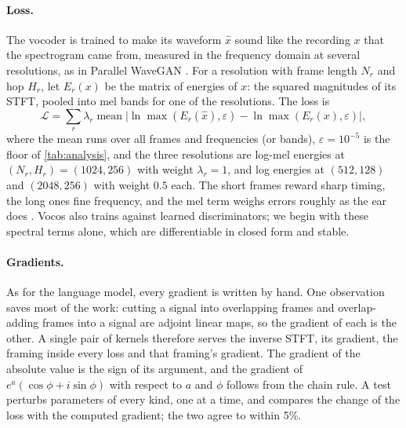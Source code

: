 \paragraph{Loss.} The vocoder is trained to make its waveform $\hat x$ sound
like the recording $x$ that the spectrogram came from, measured in the
frequency domain at several resolutions, as in Parallel WaveGAN
\cite{yamamoto2020parallel}. For a resolution with frame length $N_r$ and hop
$H_r$, let $E_r(x)$ be the matrix of energies of $x$: the squared magnitudes of
its STFT, pooled into mel bands for one of the resolutions. The loss is
\[
\mathcal{L} = \sum_r \lambda_r \operatorname{mean}\bigl|\ln\max(E_r(\hat x),\varepsilon) - \ln\max(E_r(x),\varepsilon)\bigr|,
\]
where the mean runs over all frames and frequencies (or bands), $\varepsilon =
10^{-5}$ is the floor of \cref{tab:analysis}, and the three resolutions are
log-mel energies at $(N_r, H_r) = (1024, 256)$ with weight $\lambda_r = 1$, and
log energies at $(512, 128)$ and $(2048, 256)$ with weight $0.5$ each. The
short frames reward sharp timing, the long ones fine frequency, and the mel
term weighs errors roughly as the ear does \cite{kong2020hifigan}. Vocos also
trains against learned discriminators; we begin with these spectral terms
alone, which are differentiable in closed form and stable.

\paragraph{Gradients.} As for the language model, every gradient is written by
hand. One observation saves most of the work: cutting a signal into
overlapping frames and overlap-adding frames into a signal are adjoint linear
maps, so the gradient of each is the other. A single pair of kernels therefore
serves the inverse STFT, its gradient, the framing inside every loss and that
framing's gradient. The gradient of the absolute value is the sign of its
argument, and the gradient of $e^{a}(\cos\phi + i\sin\phi)$ with respect
to $a$ and $\phi$ follows from the chain rule. A test perturbs parameters of
every kind, one at a time, and compares the change of the loss with the
computed gradient; the two agree to within 5\%.

